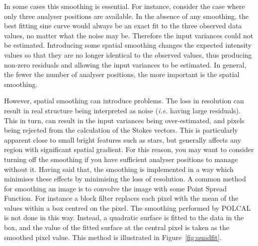 \documentclass[twoside,11pt]{starlink}
\begin{document}
\begin{enumerate}
In some cases this smoothing is essential. For instance, consider the
case where only three analyser positions are available. In the absence of
any smoothing, the best fitting sine curve would always be an exact fit
to the three observed data values, no matter what the noise may be. Therefore
the input variances could not be estimated. Introducing some spatial
smoothing changes the expected intensity values so that they are no
longer identical to the observed values, thus producing non-zero
residuals and allowing the input variances to be estimated. In general,
the fewer the number of analyser positions, the more important is the
spatial smoothing.

However, spatial smoothing can introduce problems. The loss in resolution
can result in real structure being interpreted as noise (\emph{i.e.}
having large residuals). This in turn, can result in the input variances
being over-estimated, and pixels being rejected from the calculation of
the Stokes vectors. This is particularly apparent close to small bright
features such as stars, but generally affects any region with significant
spatial gradient. For this reason, you may want to consider turning off
the smoothing if you have sufficient analyser positions to manage without
it. Having said that, the smoothing is implemented in a way which
minimises these effects by minimising the loss of resolution. A common
method for smoothing an image is to convolve the image with some Point
Spread Function. For instance a block filter replaces each pixel with the
mean of the values within a box centred on the pixel. The smoothing
performed by POLCAL is not done in this way. Instead, a quadratic surface
is fitted to the data in the box, and the value of the fitted surface at
the central pixel is taken as the smoothed pixel value. This method is
illustrated in Figure~\ref{fig:quadfit}.


\end{enumerate}
\end{document}

